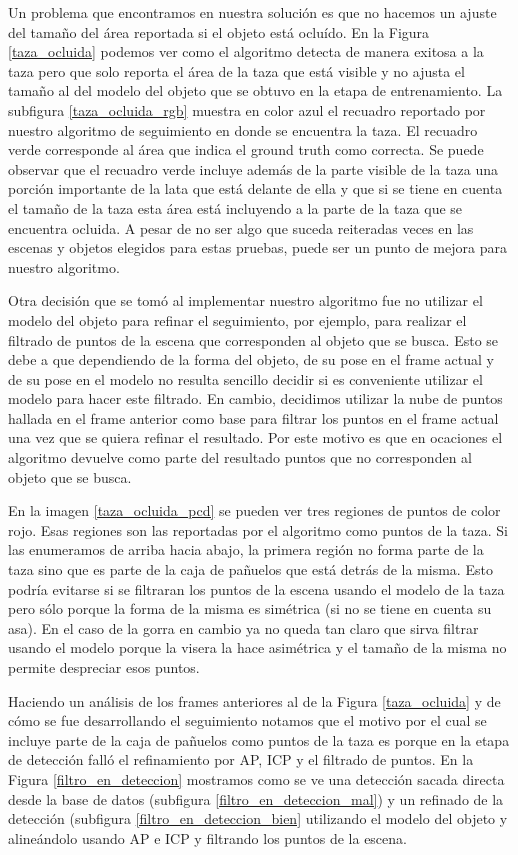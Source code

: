 Un problema que encontramos en nuestra solución es que no hacemos un ajuste del tamaño del área reportada si el objeto está ocluído. En la Figura \ref{taza_ocluida} podemos ver como el algoritmo detecta de manera exitosa a la taza pero que solo reporta el área de la taza que está visible y no ajusta el tamaño al del modelo del objeto que se obtuvo en la etapa de entrenamiento. La subfigura \ref{taza_ocluida_rgb} muestra en color azul el recuadro reportado por nuestro algoritmo de seguimiento en donde se encuentra la taza. El recuadro verde corresponde al área que indica el ground truth como correcta. Se puede observar que el recuadro verde incluye además de la parte visible de la taza una porción importante de la lata que está delante de ella y que si se tiene en cuenta el tamaño de la taza esta área está incluyendo a la parte de la taza que se encuentra ocluida. A pesar de no ser algo que suceda reiteradas veces en las escenas y objetos elegidos para estas pruebas, puede ser un punto de mejora para nuestro algoritmo.

Otra decisión que se tomó al implementar nuestro algoritmo fue no utilizar el modelo del objeto para refinar el seguimiento, por ejemplo, para realizar el filtrado de puntos de la escena que corresponden al objeto que se busca. Esto se debe a que dependiendo de la forma del objeto, de su pose en el frame actual y de su pose en el modelo no resulta sencillo decidir si es conveniente utilizar el modelo para hacer este filtrado. En cambio, decidimos utilizar la nube de puntos hallada en el frame anterior como base para filtrar los puntos en el frame actual una vez que se quiera refinar el resultado. Por este motivo es que en ocaciones el algoritmo devuelve como parte del resultado puntos que no corresponden al objeto que se busca.

En la imagen \ref{taza_ocluida_pcd} se pueden ver tres regiones de puntos de color rojo. Esas regiones son las reportadas por el algoritmo como puntos de la taza. Si las enumeramos de arriba hacia abajo, la primera región no forma parte de la taza sino que es parte de la caja de pañuelos que está detrás de la misma. Esto podría evitarse si se filtraran los puntos de la escena usando el modelo de la taza pero sólo porque la forma de la misma es simétrica (si no se tiene en cuenta su asa). En el caso de la gorra en cambio ya no queda tan claro que sirva filtrar usando el modelo porque la visera la hace asimétrica y el tamaño de la misma no permite despreciar esos puntos.

Haciendo un análisis de los frames anteriores al de la Figura \ref{taza_ocluida} y de cómo se fue desarrollando el seguimiento notamos que el motivo por el cual se incluye parte de la caja de pañuelos como puntos de la taza es porque en la etapa de detección falló el refinamiento por AP, ICP y el filtrado de puntos. En la Figura \ref{filtro_en_deteccion} mostramos como se ve una detección sacada directa desde la base de datos (subfigura \ref{filtro_en_deteccion_mal}) y un refinado de la detección (subfigura \ref{filtro_en_deteccion_bien} utilizando el modelo del objeto y alineándolo usando AP e ICP y filtrando los puntos de la escena.

